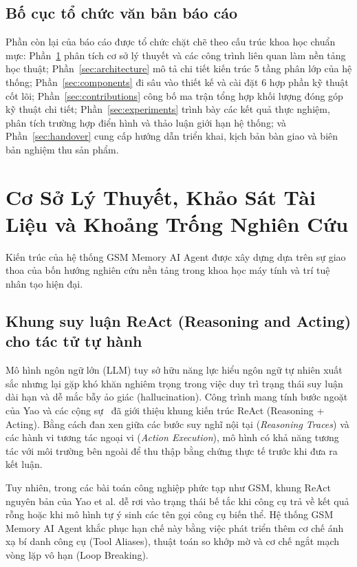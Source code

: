 \documentclass[a4paper,11pt]{article}
\begin{document}
\subsection{Bố cục tổ chức văn bản báo cáo}
Phần còn lại của báo cáo được tổ chức chặt chẽ theo cấu trúc khoa học chuẩn mực: Phần~\ref{sec:related-work} phân tích cơ sở lý thuyết và các công trình liên quan làm nền tảng học thuật; Phần~\ref{sec:architecture} mô tả chi tiết kiến trúc 5 tầng phân lớp của hệ thống; Phần~\ref{sec:components} đi sâu vào thiết kế và cài đặt 6 hợp phần kỹ thuật cốt lõi; Phần~\ref{sec:contributions} công bố ma trận tổng hợp khối lượng đóng góp kỹ thuật chi tiết; Phần~\ref{sec:experiments} trình bày các kết quả thực nghiệm, phân tích trường hợp điển hình và thảo luận giới hạn hệ thống; và Phần~\ref{sec:handover} cung cấp hướng dẫn triển khai, kịch bản bàn giao và biên bản nghiệm thu sản phẩm.

\clearpage
\section{Cơ Sở Lý Thuyết, Khảo Sát Tài Liệu và Khoảng Trống Nghiên Cứu}
\label{sec:related-work}

Kiến trúc của hệ thống GSM Memory AI Agent được xây dựng dựa trên sự giao thoa của bốn hướng nghiên cứu nền tảng trong khoa học máy tính và trí tuệ nhân tạo hiện đại.

\subsection{Khung suy luận ReAct (Reasoning and Acting) cho tác tử tự hành}
Mô hình ngôn ngữ lớn (LLM) tuy sở hữu năng lực hiểu ngôn ngữ tự nhiên xuất sắc nhưng lại gặp khó khăn nghiêm trọng trong việc duy trì trạng thái suy luận dài hạn và dễ mắc bẫy ảo giác (hallucination). Công trình mang tính bước ngoặt của Yao và các cộng sự~\cite{yao2022react} đã giới thiệu khung kiến trúc ReAct (Reasoning + Acting). Bằng cách đan xen giữa các bước suy nghĩ nội tại (\textit{Reasoning Traces}) và các hành vi tương tác ngoại vi (\textit{Action Execution}), mô hình có khả năng tương tác với môi trường bên ngoài để thu thập bằng chứng thực tế trước khi đưa ra kết luận. 

Tuy nhiên, trong các bài toán công nghiệp phức tạp như GSM, khung ReAct nguyên bản của Yao et al. dễ rơi vào trạng thái bế tắc khi công cụ trả về kết quả rỗng hoặc khi mô hình tự ý sinh các tên gọi công cụ biến thể. Hệ thống GSM Memory AI Agent khắc phục hạn chế này bằng việc phát triển thêm cơ chế ánh xạ bí danh công cụ (Tool Aliases), thuật toán so khớp mờ và cơ chế ngắt mạch vòng lặp vô hạn (Loop Breaking).
\end{document}

